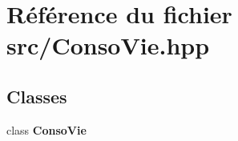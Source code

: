 \section{Référence du fichier src/\-Conso\-Vie.hpp}
\label{_conso_vie_8hpp}
\subsection*{Classes}
\begin{DoxyCompactItemize}
\item 
class {\bf Conso\-Vie}
\end{DoxyCompactItemize}
